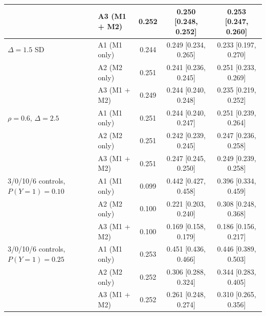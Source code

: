 \begin{tabular}{llccc}
 & A3 (M1 + M2) & 0.252 & 0.250 [0.248, 0.252] & 0.253 [0.247, 0.260] \\
\midrule
$\Delta = 1.5$ SD & A1 (M1 only) & 0.244 & 0.249 [0.234, 0.265] & 0.233 [0.197, 0.270] \\
 & A2 (M2 only) & 0.251 & 0.241 [0.236, 0.245] & 0.251 [0.233, 0.269] \\
 & A3 (M1 + M2) & 0.249 & 0.244 [0.240, 0.248] & 0.235 [0.219, 0.252] \\
\midrule
$\rho = 0.6$, $\Delta = 2.5$ & A1 (M1 only) & 0.251 & 0.244 [0.240, 0.247] & 0.251 [0.239, 0.264] \\
 & A2 (M2 only) & 0.251 & 0.242 [0.239, 0.245] & 0.247 [0.236, 0.258] \\
 & A3 (M1 + M2) & 0.251 & 0.247 [0.245, 0.250] & 0.249 [0.239, 0.258] \\
\midrule
3/0/10/6 controls, $P(Y=1) = 0.10$ & A1 (M1 only) & 0.099 & 0.442 [0.427, 0.458] & 0.396 [0.334, 0.459] \\
 & A2 (M2 only) & 0.100 & 0.221 [0.203, 0.240] & 0.308 [0.248, 0.368] \\
 & A3 (M1 + M2) & 0.100 & 0.169 [0.158, 0.179] & 0.186 [0.156, 0.217] \\
\midrule
3/0/10/6 controls, $P(Y=1) = 0.25$ & A1 (M1 only) & 0.253 & 0.451 [0.436, 0.466] & 0.446 [0.389, 0.503] \\
 & A2 (M2 only) & 0.252 & 0.306 [0.288, 0.324] & 0.344 [0.283, 0.405] \\
 & A3 (M1 + M2) & 0.252 & 0.261 [0.248, 0.274] & 0.310 [0.265, 0.356] \\
\bottomrule
\end{tabular}
